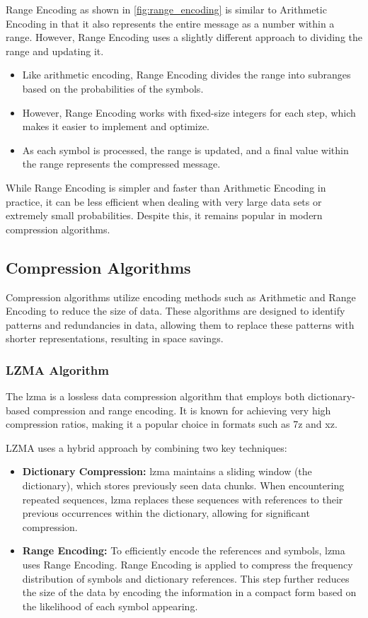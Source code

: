     Range Encoding as shown in \autoref{fig:range_encoding} is similar to Arithmetic Encoding in that it also represents the entire message as a number within a range. However, Range Encoding uses a slightly different approach to dividing the range and updating it.

    \begin{itemize}
        \item Like arithmetic encoding, Range Encoding divides the range into subranges based on the probabilities of the symbols.
        \item However, Range Encoding works with fixed-size integers for each step, which makes it easier to implement and optimize.
        \item As each symbol is processed, the range is updated, and a final value within the range represents the compressed message.
    \end{itemize}

    While Range Encoding is simpler and faster than Arithmetic Encoding in practice, it can be less efficient when dealing with very large data sets or extremely small probabilities. Despite this, it remains popular in modern compression algorithms.

    \subsection{Compression Algorithms}
    Compression algorithms utilize encoding methods such as Arithmetic and Range Encoding to reduce the size of data. These algorithms are designed to identify patterns and redundancies in data, allowing them to replace these patterns with shorter representations, resulting in space savings.

    \subsubsection{LZMA Algorithm}
    The \gls{lzma} is a lossless data compression algorithm that employs both dictionary-based compression and range encoding. It is known for achieving very high compression ratios, making it a popular choice in formats such as 7z and xz.

    LZMA uses a hybrid approach by combining two key techniques:
    \begin{itemize}
        \item \textbf{Dictionary Compression:} \gls{lzma} maintains a sliding window (the dictionary), which stores previously seen data chunks. When encountering repeated sequences, \gls{lzma} replaces these sequences with references to their previous occurrences within the dictionary, allowing for significant compression.
        \item \textbf{Range Encoding:} To efficiently encode the references and symbols, \gls{lzma} uses Range Encoding. Range Encoding is applied to compress the frequency distribution of symbols and dictionary references. This step further reduces the size of the data by encoding the information in a compact form based on the likelihood of each symbol appearing.
    \end{itemize}

